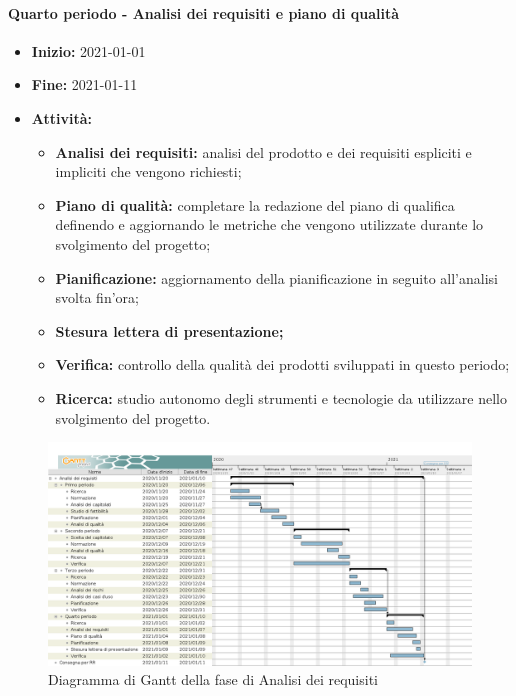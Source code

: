 \paragraph[Quarto periodo]{Quarto periodo - \textnormal{Analisi dei requisiti e piano di qualità}}
\begin{itemize}
    \item [] \textbf{Inizio:} 2021-01-01
    \item [] \textbf{Fine:} 2021-01-11
    \item [] \textbf{Attività:}
          \begin{itemize}
              \item \textbf{Analisi dei requisiti:} analisi del prodotto e dei requisiti espliciti e impliciti che vengono richiesti;
              \item \textbf{Piano di qualità:} completare la redazione del piano di qualifica definendo e aggiornando le metriche che vengono utilizzate durante lo svolgimento del progetto;
              \item \textbf{Pianificazione:} aggiornamento della pianificazione in seguito all'analisi svolta fin'ora;
              \item \textbf{Stesura lettera di presentazione;}
              \item \textbf{Verifica:} controllo della qualità dei prodotti sviluppati in questo periodo;
              \item \textbf{Ricerca:} studio autonomo degli strumenti e tecnologie da utilizzare nello svolgimento del progetto.
          \end{itemize}
\end{itemize}
\begin{figure}[H]
    \centering
    \includegraphics[width=1\linewidth]{res/images/pianificazione/analisi_dei_requisiti.png}
    \caption{Diagramma di Gantt della fase di Analisi dei requisiti}
    \label{fig:_Gantt analisi dei requisiti}
\end{figure}


